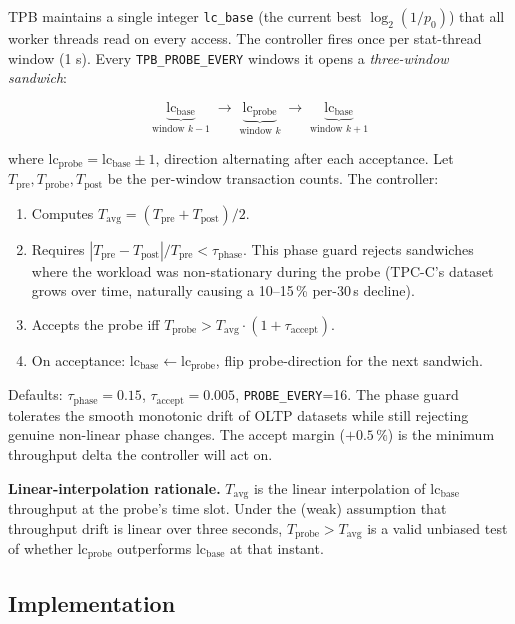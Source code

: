 \documentclass[10pt,twocolumn]{article}
\begin{document}
TPB maintains a single integer \texttt{lc\_base} (the current best
$\log_2(1/p_0)$) that all worker threads read on every access.  The
controller fires once per stat-thread window (1 s).  Every
\texttt{TPB\_PROBE\_EVERY} windows it opens a \emph{three-window sandwich}:

\[
\underbrace{\text{lc}_{\text{base}}}_{\text{window } k-1} \;\to\;
\underbrace{\text{lc}_{\text{probe}}}_{\text{window } k} \;\to\;
\underbrace{\text{lc}_{\text{base}}}_{\text{window } k+1}
\]

\noindent
where $\text{lc}_{\text{probe}} = \text{lc}_{\text{base}} \pm 1$, direction
alternating after each acceptance.  Let $T_{\text{pre}}, T_{\text{probe}},
T_{\text{post}}$ be the per-window transaction counts.  The controller:

\begin{enumerate}\itemsep0pt
\item Computes
  $T_{\text{avg}} = (T_{\text{pre}} + T_{\text{post}}) / 2$.
\item Requires
  $|T_{\text{pre}} - T_{\text{post}}| / T_{\text{pre}} < \tau_{\text{phase}}$.
  This phase guard rejects sandwiches where the workload was non-stationary
  during the probe (TPC-C's dataset grows over time, naturally causing a
  10--15\,\% per-30\,s decline).
\item Accepts the probe iff
  $T_{\text{probe}} > T_{\text{avg}} \cdot (1 + \tau_{\text{accept}})$.
\item On acceptance: $\text{lc}_{\text{base}} \leftarrow
  \text{lc}_{\text{probe}}$, flip probe-direction for the next sandwich.
\end{enumerate}

\noindent
Defaults: $\tau_{\text{phase}}\!=\!0.15$,
$\tau_{\text{accept}}\!=\!0.005$, \texttt{PROBE\_EVERY}=16.  The phase
guard tolerates the smooth monotonic drift of OLTP datasets while still
rejecting genuine non-linear phase changes.  The accept margin
($+0.5\,\%$) is the minimum throughput delta the controller will act on.

\textbf{Linear-interpolation rationale.}  $T_{\text{avg}}$ is the
linear interpolation of $\text{lc}_{\text{base}}$ throughput at the
probe's time slot.  Under the (weak) assumption that throughput drift
is linear over three seconds, $T_{\text{probe}} > T_{\text{avg}}$ is a
valid unbiased test of whether $\text{lc}_{\text{probe}}$ outperforms
$\text{lc}_{\text{base}}$ at that instant.

\subsection{Implementation}
\end{document}
